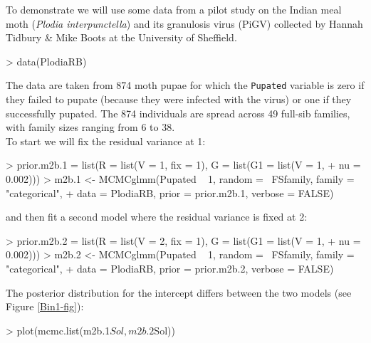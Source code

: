 \documentclass{article}
\begin{document}
To demonstrate we will use some data from a pilot study on the Indian meal moth (\emph{Plodia interpunctella}) and its granulosis virus (PiGV) collected by Hannah Tidbury \& Mike Boots at the University of Sheffield.

\begin{Schunk}
\begin{Sinput}
> data(PlodiaRB)
\end{Sinput}
\end{Schunk}

The data are taken from  874 moth pupae for which the \texttt{Pupated} variable is zero if they failed to pupate (because they were infected with the virus) or one if they successfully pupated. The 874 individuals are spread across 49 full-sib families, with family sizes ranging from 6 to 38.\\

To start we will fix the residual variance at 1:

\begin{Schunk}
\begin{Sinput}
> prior.m2b.1 = list(R = list(V = 1, fix = 1), G = list(G1 = list(V = 1, 
+     nu = 0.002)))
> m2b.1 <- MCMCglmm(Pupated ~ 1, random = ~FSfamily, family = "categorical", 
+     data = PlodiaRB, prior = prior.m2b.1, verbose = FALSE)
\end{Sinput}
\end{Schunk}

and then fit a second model where the residual variance is fixed at 2:

\begin{Schunk}
\begin{Sinput}
> prior.m2b.2 = list(R = list(V = 2, fix = 1), G = list(G1 = list(V = 1, 
+     nu = 0.002)))
> m2b.2 <- MCMCglmm(Pupated ~ 1, random = ~FSfamily, family = "categorical", 
+     data = PlodiaRB, prior = prior.m2b.2, verbose = FALSE)
\end{Sinput}
\end{Schunk}

The posterior distribution for the intercept differs between the two models (see Figure \ref{Bin1-fig}): 

\begin{Schunk}
\begin{Sinput}
> plot(mcmc.list(m2b.1$Sol, m2b.2$Sol))
\end{Sinput}
\end{Schunk}
\end{document}
